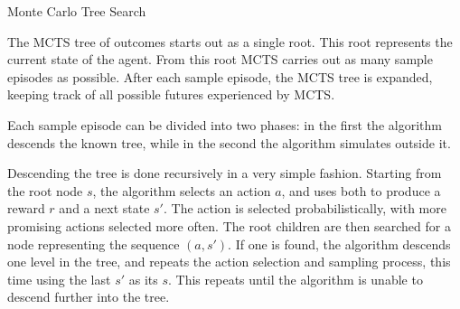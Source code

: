 \begin{algorithm}
\begin{multicols}{2}
    \caption{Monte Carlo Tree Search}


    \setcounter{AlgoLine}{0}

    \setcounter{AlgoLine}{0}

\end{multicols}
\end{algorithm}

The MCTS tree of outcomes starts out as a single root. This root represents the current state of the
agent. From this root MCTS carries out as many sample episodes as possible. After each sample
episode, the MCTS tree is expanded, keeping track of all possible futures experienced by MCTS.

Each sample episode can be divided into two phases: in the first the algorithm descends the
known tree, while in the second the algorithm simulates outside it.

Descending the tree is done recursively in a very simple fashion. Starting from the root node $s$, the
algorithm selects an action $a$, and uses both to produce a reward $r$ and a next state $s'$. The
action is selected probabilistically, with more promising actions selected more often.  The root
children are then searched for a node representing the sequence $(a,s')$. If one is found, the
algorithm descends one level in the tree, and repeats the action selection and sampling process,
this time using the last $s'$ as its $s$.  This repeats until the algorithm is unable to descend
further into the tree.

